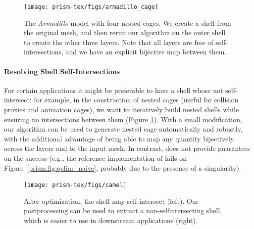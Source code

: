 \begin{figure}
    \centering
    \texttt{[image: prism-tex/figs/armadillo\_cage]}
    \caption{The \protect\emph{Armadillo} model with four nested cages. We create a shell from the original mesh, and then rerun our algorithm on the outer shell to create the other three layers. Note that all layers are free of self-intersections, and we have an explicit bijective map between them.}
    
    \label{prism:fig:nested-cages}
\end{figure}

\paragraph{Resolving Shell Self-Intersections}
\label{prism:sec:postprocessing}
For certain applications it might be preferable to have a shell whose   not self-intersect:
for example, in the construction of nested cages \cite{sacht2015nested} (useful for collision proxies and animation cages), we want to iteratively build nested shells while ensuring no intersections between them (Figure \ref{prism:fig:nested-cages}). 
With a small modification, our algorithm can be used to generate nested cage automatically and robustly, with the additional advantage of being able to map any quantity  bijectively across the layers and to the input mesh. In contrast, \cite{sacht2015nested}
does not provide guarantees on the success (e.g., the reference implementation of \cite{sacht2015nested} fails on Figure~\ref{prism:fig:qslim_naive}, probably due to the presence of a singularity). 
\begin{figure}
    \centering
    \texttt{[image: prism-tex/figs/camel]}
    \caption{After optimization, the shell may self-intersect (left). Our postprocessing can be used to extract a non-selfintersecting shell, which is easier to use in downstream applications (right).}
    \label{prism:fig:shell_shrinking-cages}
    
\end{figure}

